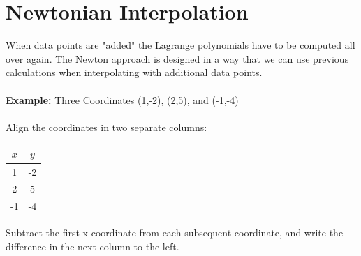 \documentclass[a4paper,12pt,]{report}
\begin{document}
\section{Newtonian Interpolation}
	When data points are "added" the Lagrange polynomials have to be computed all over again. The Newton approach
	is designed in a way that we can use previous calculations when interpolating with additional data points.\\ \\

	\noindent \textbf{Example:} Three Coordinates (1,-2), (2,5), and (-1,-4)\\ \\

	\noindent Align the coordinates in two separate columns:

\begin{center}
	\begin{tabular}{cc}
	$x$ & $y$\\
	\hline
	1 & -2\\
	2 & 5 \\
	-1&-4
	\end{tabular}
\end{center}

	\noindent Subtract the first x-coordinate from each subsequent coordinate, and write the difference in the next column to the left.
	\vspace {-0.4cm}

\begin{center}
\end{center}
	
\end{document}
